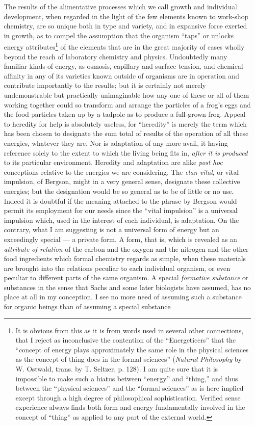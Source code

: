 \documentclass[a4paper, 11pt, oneside, polutonikogreek, english]{article}
\begin{document}
The results of the alimentative processes which we call growth and individual development, when regarded in the light of the few elements known to work-shop chemistry, are so unique both in type and variety, and in expansive force exerted in growth, as to compel the assumption that the organism ``taps'' or unlocks energy attributes\footnote{It is obvious from this as it is from words used in several other connections, that I reject as inconclusive the contention of the ``Energeticers'' that the ``concept of energy plays approximately the same role in the physical sciences as the concept of thing does in the formal sciences'' (\emph{Natural Philosophy} by W. Ostwald, trans. by T. Seltzer, p. 128). I am quite sure that it is impossible to make such a hiatus between ``energy'' and ``thing,'' and thus between the ``physical sciences'' and the ``formal sciences'' as is here implied except through a high degree of philosophical sophistication. Verified sense experience always finds both form and energy fundamentally involved in the concept of ``thing'' as applied to any part of the external world.} of the elements that are in the great majority of cases wholly beyond the reach of laboratory chemistry and physics. Undoubtedly many familiar kinds of energy, as osmosis, capillary and surface tension, and chemical affinity in any of its varieties known outside of organisms are in operation and contribute importantly to the results; but it is certainly not merely undemonstrable but practically unimaginable how any one of these or all of them working together could so transform and arrange the particles of a frog's eggs and the food particles taken up by a tadpole as to produce a full-grown frog. Appeal to heredity for help is absolutely useless, for ``heredity'' is merely the term which has been chosen to designate the sum total of results of the operation of all these energies, whatever they are. Nor is adaptation of any more avail, it having reference solely to the extent to which the living being fits in, \emph{after it is produced} to its particular environment. Heredity and adaptation are alike \emph{post hoc} conceptions relative to the energies we are considering. The \emph{elan vital}, or vital impulsion, of Bergson, might in a very general sense, designate these collective energies; but the designation would be so general as to be of little or no use. Indeed it is doubtful if the meaning attached to the phrase by Bergson would permit its employment for our needs since the ``vital impulsion'' is a universal impulsion which, used in the interest of each individual, is adaptation. On the contrary, what I am suggesting is not a universal form of energy but an exceedingly special --- a private form. A form, that is, which is revealed as an \emph{attribute of relation} of the carbon and the oxygen and the nitrogen and the other food ingredients which formal chemistry regards as simple, when these materials are brought into the relations peculiar to each individual organism, or even peculiar to different parts of the same organism. A special \emph{formative substance} or substances in the sense that Sachs and some later biologists have assumed, has no place at all in my conception. I see no more need of assuming such a substance for organic beings than of assuming a special substance 
\end{document}
